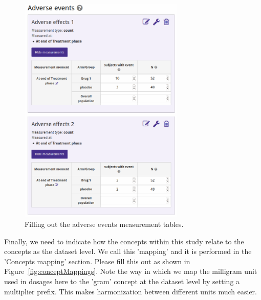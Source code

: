 \documentclass[12pt]{article}
\begin{document}
\begin{figure}[!ht]
  \centering
  \includegraphics[width=0.7\textwidth]{img/aeData.png}
  \caption{Filling out the adverse events measurement tables.}
\label{fig:aeData}
\end{figure}

Finally, we need to indicate how the concepts within this study relate to the concepts as the dataset level.
We call this 'mapping' and it is performed in the 'Concepts mapping' section.
Please fill this out as shown in Figure~\ref{fig:conceptMappings}.
Note the way in which we map the milligram unit used in dosages here to the 'gram' concept at the dataset level by setting a multiplier prefix.
This makes harmonization between different units much easier.
\end{document}
